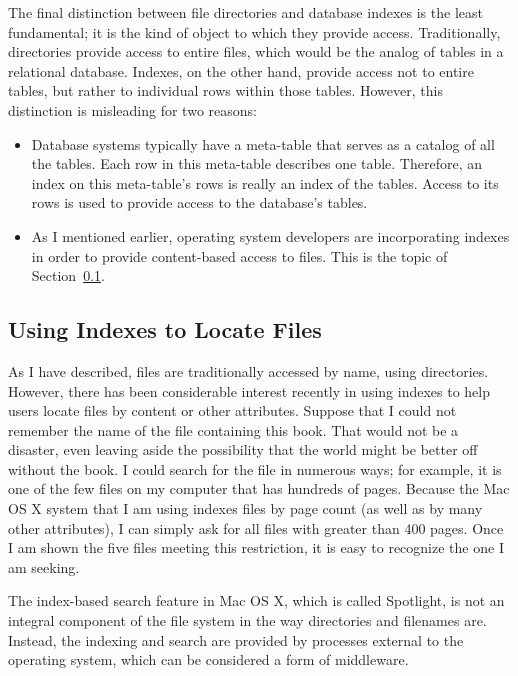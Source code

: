 The final distinction between file directories and database indexes is
the least fundamental; it is the kind of object to which they provide
access.  Traditionally, directories provide access to entire files,
which would be the analog of tables in a relational database.
Indexes, on the other hand, provide access not to entire tables, but
rather to individual rows within those tables.  However, this
distinction is misleading for two reasons:
\begin{itemize}
\item
Database systems typically have a meta-table that serves as a catalog
of all the tables.  Each row in this meta-table describes one table.
Therefore, an index on this meta-table's rows is really an index of
the tables.  Access to its rows is used to provide access to the
database's tables.
\item
As I mentioned earlier, operating system developers are incorporating
indexes in order to provide content-based access to files.  This is
the topic of Section~\ref{spotlight-section}.
\end{itemize}

\subsection{Using Indexes to Locate Files}\label{spotlight-section}

As I have described, files are traditionally accessed by name, using
directories.  However, there has been considerable interest recently
in using indexes to help users locate files by content or other
attributes. Suppose that I could not remember the name
of the file containing this book.  That would not be a disaster, even
leaving aside the possibility that the world might be better off
without the book.  I could search for the file in numerous ways; for
example, it is one of the few files on my computer that has hundreds
of pages.  Because the Mac OS X system that I am using indexes files
by page count (as well as by many other attributes), I can simply ask for all
files with greater than 400 pages.  Once I am shown the five files
meeting this restriction, it is easy to recognize the one I am seeking.

The index-based search feature in Mac OS X, which is called Spotlight,
is not an integral component of the file system in the way directories
and filenames are.  Instead, the indexing and search are provided by
processes external to the operating system, which can be considered a
form of middleware.

